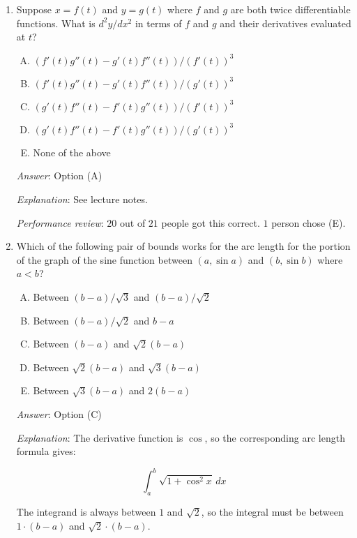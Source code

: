 \documentclass[10pt]{amsart}
\begin{document}
\begin{enumerate}
  {\em Performance review}: $20$ out of $21$ people got this
  correct. $1$ person left the question blank.

  {\em Historical note}: I put this question in a quiz for Math 152
  back in October of this year, and $14$ of $14$ people who took that
  quiz got it correct.
\item Suppose $x = f(t)$ and $y = g(t)$ where $f$ and $g$ are both
  twice differentiable functions. What is $d^2y/dx^2$ in terms of $f$
  and $g$ and their derivatives evaluated at $t$?

  \begin{enumerate}[(A)]
  \item $(f'(t)g''(t) - g'(t)f''(t))/(f'(t))^3$
  \item $(f'(t)g''(t) - g'(t)f''(t))/(g'(t))^3$
  \item $(g'(t)f''(t) - f'(t)g''(t))/(f'(t))^3$
  \item $(g'(t)f''(t) - f'(t)g''(t))/(g'(t))^3$
  \item None of the above
  \end{enumerate}

  {\em Answer}: Option (A)

  {\em Explanation}: See lecture notes.

  {\em Performance review}: $20$ out of $21$ people got this
  correct. $1$ person chose (E).
\item Which of the following pair of bounds works for the arc length
  for the portion of the graph of the sine function between $(a,\sin
  a)$ and $(b, \sin b)$ where $a < b$?

  \begin{enumerate}[(A)]
  \item Between $(b - a)/\sqrt{3}$ and $(b - a)/\sqrt{2}$
  \item Between $(b - a)/\sqrt{2}$ and $b - a$
  \item Between $(b - a)$ and $\sqrt{2}(b - a)$
  \item Between $\sqrt{2}(b - a)$ and $\sqrt{3}(b - a)$
  \item Between $\sqrt{3}(b - a)$ and $2(b - a)$
  \end{enumerate}

  {\em Answer}: Option (C)

  {\em Explanation}: The derivative function is $\cos$, so the
  corresponding arc length formula gives:

  $$\int_a^b \sqrt{1 + \cos^2x} \, dx$$

  The integrand is always between $1$ and $\sqrt{2}$, so the integral
  must be between $1 \cdot (b - a)$ and $\sqrt{2} \cdot (b - a)$.


\end{enumerate}
\end{document}

